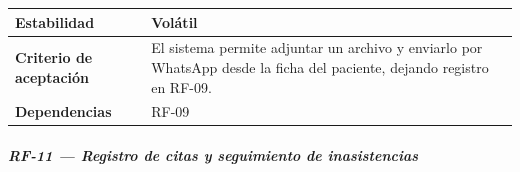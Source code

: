 \documentclass[
]{article}
\begin{document}
{\begin{longtable}[]{|
  >{\raggedright\arraybackslash}p{}|
  >{\raggedright\arraybackslash}p{}|}
\hline
\textbf{Estabilidad} & \begin{minipage}[t]{\linewidth}\raggedright
Volátil
\end{minipage} \\
\hline
\textbf{Criterio de aceptación} &
\begin{minipage}[t]{\linewidth}\raggedright
El sistema permite adjuntar un archivo y enviarlo por WhatsApp desde la ficha del paciente, dejando registro en RF-09.
\end{minipage} \\
\hline
\textbf{Dependencias} & \begin{minipage}[t]{\linewidth}\raggedright
RF-09
\end{minipage} \\
\hline
\end{longtable}
}

\subparagraph{RF-11 --- Registro de citas y seguimiento de inasistencias}\label{rf-11-registro-de-citas-y-seguimiento-de-inasi}
\end{document}
